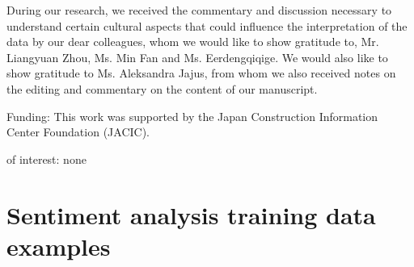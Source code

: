 \begin{acknowledgements}

During our research, we received the commentary and discussion necessary to understand certain cultural aspects that could influence the interpretation of the data by our dear colleagues, whom we would like to show gratitude to, Mr. Liangyuan Zhou, Ms. Min Fan and Ms. Eerdengqiqige. We would also like to show gratitude to Ms. Aleksandra Jajus, from whom we also received notes on the editing and commentary on the content of our manuscript.

\medskip

Funding: This work was supported by the Japan Construction Information Center Foundation (JACIC).

\medskip

\DIFdelbegin {}\DIFdelend \DIFaddbegin {}\DIFaddend of interest: none

\end{acknowledgements}


\clearpage




\clearpage

\appendixpage
\appendix

\section{Sentiment analysis training data examples}\label{apx:sentences_ex}

